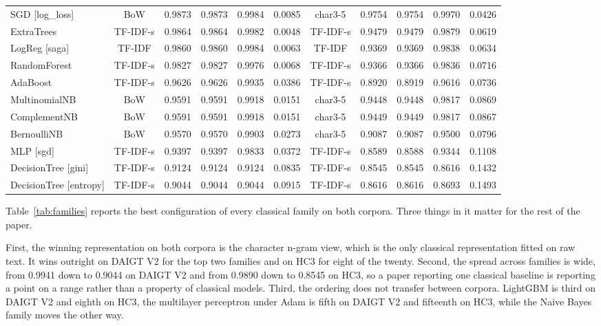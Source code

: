 \documentclass[conference,a4paper]{IEEEtran}
\begin{document}
\begin{table}[!t]
\begin{tabular}{@{}lccccc@{\hspace{10pt}}ccccc@{}}
SGD [log\_loss] & BoW & 0.9873 & 0.9873 & 0.9984 & 0.0085 & char3-5 & 0.9754 & 0.9754 & 0.9970 & 0.0426 \\
ExtraTrees & TF-IDF-s & 0.9864 & 0.9864 & 0.9982 & 0.0048 & TF-IDF-s & 0.9479 & 0.9479 & 0.9879 & 0.0619 \\
LogReg [saga] & TF-IDF & 0.9860 & 0.9860 & 0.9984 & 0.0063 & TF-IDF & 0.9369 & 0.9369 & 0.9838 & 0.0634 \\
RandomForest & TF-IDF-s & 0.9827 & 0.9827 & 0.9976 & 0.0068 & TF-IDF-s & 0.9366 & 0.9366 & 0.9836 & 0.0716 \\
AdaBoost & TF-IDF-s & 0.9626 & 0.9626 & 0.9935 & 0.0386 & TF-IDF-s & 0.8920 & 0.8919 & 0.9616 & 0.0736 \\
MultinomialNB & BoW & 0.9591 & 0.9591 & 0.9918 & 0.0151 & char3-5 & 0.9448 & 0.9448 & 0.9817 & 0.0869 \\
ComplementNB & BoW & 0.9591 & 0.9591 & 0.9918 & 0.0151 & char3-5 & 0.9449 & 0.9449 & 0.9817 & 0.0867 \\
BernoulliNB & BoW & 0.9570 & 0.9570 & 0.9903 & 0.0273 & char3-5 & 0.9087 & 0.9087 & 0.9500 & 0.0796 \\
MLP [sgd] & TF-IDF-s & 0.9397 & 0.9397 & 0.9833 & 0.0372 & TF-IDF-s & 0.8589 & 0.8588 & 0.9344 & 0.1108 \\
DecisionTree [gini] & TF-IDF-s & 0.9124 & 0.9124 & 0.9124 & 0.0835 & TF-IDF-s & 0.8545 & 0.8545 & 0.8616 & 0.1432 \\
DecisionTree [entropy] & TF-IDF-s & 0.9044 & 0.9044 & 0.9044 & 0.0915 & TF-IDF-s & 0.8616 & 0.8616 & 0.8693 & 0.1493 \\
\bottomrule
\end{tabular}
\end{table}

Table~\ref{tab:families} reports the best configuration of every classical family on both corpora. Three things in it matter for the rest of the paper.

First, the winning representation on both corpora is the character n-gram view, which is the only classical representation fitted on raw text. It wins outright on DAIGT V2 for the top two families and on HC3 for eight of the twenty. Second, the spread across families is wide, from 0.9941 down to 0.9044 on DAIGT V2 and from 0.9890 down to 0.8545 on HC3, so a paper reporting one classical baseline is reporting a point on a range rather than a property of classical models. Third, the ordering does not transfer between corpora. LightGBM is third on DAIGT V2 and eighth on HC3, the multilayer perceptron under Adam is fifth on DAIGT V2 and fifteenth on HC3, while the Naive Bayes family moves the other way.
\end{document}
